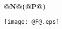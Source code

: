 \documentclass{article}
\begin{document}
\begin{center}\LARGE\bf
    @N@(@P@)
\end{center}

\vspace{1ex}

\begin{center}
  \texttt{[image: @F@.eps]}
\end{center}
\end{document}
